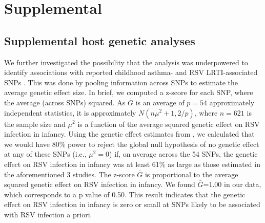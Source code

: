 \documentclass[9pt,lineno]{elife}  %
\newcommand{\beginsupplement}{%
        \setcounter{table}{0}
        \renewcommand{\thetable}{S\arabic{table}}%
        \setcounter{figure}{0}
        \renewcommand{\thefigure}{S\arabic{figure}}%
     }
\begin{document}
%



\beginsupplement
\section{Supplemental}
 \label{sec:Supplemental_text}

\subsection{Supplemental host genetic analyses}
We further investigated the possibility that the analysis was underpowered to identify associations with reported childhood asthma- and RSV LRTI-associated SNPs \citep{pividori2019shared, janssen2007genetic, pasanen2017genome}.
This was done by pooling information across SNPs to estimate the average genetic effect size. In brief, we computed a z-score for each SNP, where the average (across SNPs) squared. 
As $\bar{G}$  is an average of $p=54$ approximately independent statistics, it is approximately
$N(n\mu^2 + 1,2/p)$, where $n=621$  is the sample size and $\mu^2$ is a function of the average squared
genetic effect on RSV infection in infancy. Using the genetic effect estimates from 
\citet{pividori2019shared, janssen2007genetic, pasanen2017genome}
, we calculated that we would have 80\% power
to reject the global null hypothesis of no genetic effect at any of
these SNPs (i.e., $\mu^2 =0$) if, on average across the 54 SNPs, the genetic effect on RSV infection
in infancy was at least 61\% as large as those estimated in the aforementioned 3 studies. The 
z-score $\bar{G}$ is proportional to the average squared genetic effect on RSV infection in infancy. We
found $\bar{G}$=1.00  in our data, which corresponds to a p value of 0.50. This result indicates that the genetic effect on RSV infection in infancy is zero or small at SNPs likely to be associated with RSV infection a priori.
\end{document}
